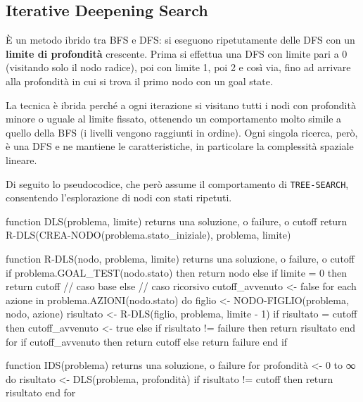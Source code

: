 \documentclass[a4paper, 11pt, oneside]{book}
\theoremstyle{definition}
\begin{document}
	\subsection{Iterative Deepening Search}
	\`E un metodo ibrido tra BFS e DFS: si eseguono ripetutamente delle DFS con un
	\textbf{limite di profondit\`a} crescente. Prima si effettua una DFS con limite pari a 0
	(visitando solo il nodo radice), poi con limite 1, poi 2 e cos\`i via, fino ad arrivare
	alla profondit\`a in cui si trova il primo nodo con un goal state.

	La tecnica \`e ibrida perch\'e a ogni iterazione si visitano tutti i nodi con
	profondit\`a minore o uguale al limite fissato, ottenendo un comportamento molto simile
	a quello della BFS (i livelli vengono raggiunti in ordine). Ogni singola ricerca, per\`o,
	\`e una DFS e ne mantiene le caratteristiche, in particolare la complessit\`a spaziale
	lineare.

	Di seguito lo pseudocodice, che per\`o assume il comportamento di 
    \mbox{\texttt{TREE-SEARCH}}, consentendo l'esplorazione di nodi con stati ripetuti.

\begin{codice}
function DLS(problema, limite) returns una soluzione, o failure, o cutoff
    return R-DLS(CREA-NODO(problema.stato_iniziale), problema, limite)

function R-DLS(nodo, problema, limite) returns una soluzione, o failure, o cutoff
    if problema.GOAL_TEST(nodo.stato) then return nodo
    else if limite = 0 then return cutoff          // caso base
    else                                           // caso ricorsivo
        cutoff_avvenuto <- false
        for each azione in problema.AZIONI(nodo.stato) do
            figlio <- NODO-FIGLIO(problema, nodo, azione)
            risultato <- R-DLS(figlio, problema, limite - 1)
            if risultato = cutoff then cutoff_avvenuto <- true
            else if risultato != failure then return risultato
        end for
        if cutoff_avvenuto then return cutoff
        else return failure
    end if
\end{codice}

\begin{codice}
function IDS(problema) returns una soluzione, o failure
    for profondità <- 0 to ∞ do
        risultato <- DLS(problema, profondità)
        if risultato != cutoff then return risultato
    end for
\end{codice}
\end{document}
